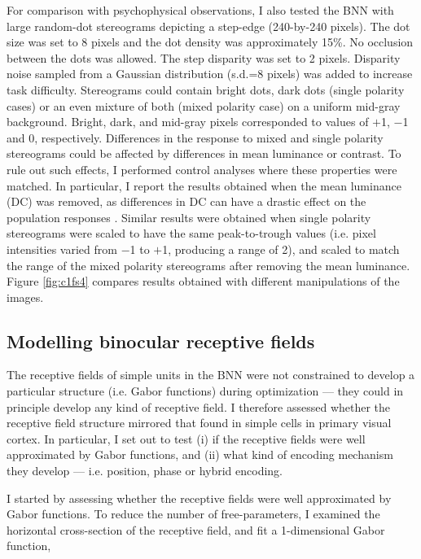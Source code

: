 For comparison with psychophysical observations, I also tested the BNN with large random-dot stereograms depicting a step-edge (240-by-240 pixels). The dot size was set to 8 pixels and the dot density was approximately 15\%. No occlusion between the dots was allowed. The step disparity was set to 2 pixels. Disparity noise sampled from a Gaussian distribution (s.d.=8 pixels) was added to increase task difficulty. Stereograms could contain bright dots, dark dots (single polarity cases) or an even mixture of both (mixed polarity case) on a uniform mid-gray background. Bright, dark, and mid-gray pixels corresponded to values of $+$1, $-$1 and 0, respectively. Differences in the response to mixed and single polarity stereograms could be affected by differences in mean luminance or contrast. To rule out such effects, I performed control analyses where these properties were matched. In particular, I report the results obtained when the mean luminance (DC) was removed, as differences in DC can have a drastic effect on the population responses \cite{Read:2011im}. Similar results were obtained when single polarity stereograms were scaled to have the same peak-to-trough values (i.e. pixel intensities varied from $-$1 to $+$1, producing a range of 2), and scaled to match the range of the mixed polarity stereograms after removing the mean luminance. Figure \ref{fig:c1fs4} compares results obtained with different manipulations of the images.

\subsection*{Modelling binocular receptive fields}

The receptive fields of simple units in the BNN were not constrained to develop a particular structure (i.e. Gabor functions) during optimization --- they could in principle develop any kind of receptive field. I therefore assessed whether the receptive field structure mirrored that found in simple cells in primary visual cortex. In particular, I set out to test (i) if the receptive fields were well approximated by Gabor functions, and (ii) what kind of encoding mechanism they develop --- i.e. position, phase or hybrid encoding. 

I started by assessing whether the receptive fields were well approximated by Gabor functions. To reduce the number of free-parameters, I examined the horizontal cross-section of the receptive field, and fit a 1-dimensional Gabor function,


